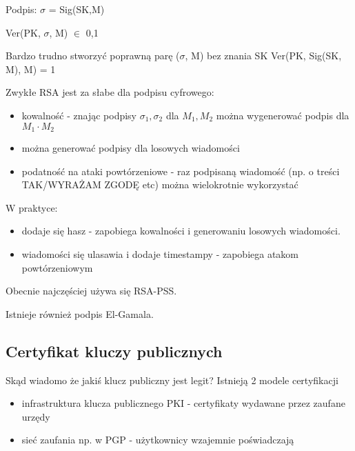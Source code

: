 Podpis: $\sigma$ = Sig(SK,M)

Ver(PK, $\sigma$, M) $\in$ {0,1}


Bardzo trudno stworzyć poprawną parę ($\sigma$, M) bez znania SK
Ver(PK, Sig(SK, M), M) = 1

Zwykłe RSA jest za słabe dla podpisu cyfrowego:
\begin{itemize}
    \item kowalność - znając podpisy $\sigma_1, \sigma_2$ dla $M_1, M_2$ można wygenerować podpis dla $M_1 \cdot M_2$

    \item można generować podpisy dla losowych wiadomości

    \item podatność na ataki powtórzeniowe - raz podpisaną wiadomość (np. o treści TAK/WYRAŻAM ZGODĘ etc) można wielokrotnie wykorzystać
\end{itemize}

W praktyce:
\begin{itemize}
    \item dodaje się hasz - zapobiega kowalności i generowaniu losowych wiadomości. 

    \item wiadomości się ulasawia i dodaje timestampy - zapobiega atakom powtórzeniowym
\end{itemize}

Obecnie najczęściej używa się RSA-PSS.

Istnieje również podpis El-Gamala.

\subsection{Certyfikat kluczy publicznych}
Skąd wiadomo że jakiś klucz publiczny jest legit?
Istnieją 2 modele certyfikacji
\begin{itemize}
    \item infrastruktura klucza publicznego PKI - certyfikaty wydawane przez zaufane urzędy

    \item sieć zaufania np. w PGP - użytkownicy wzajemnie poświadczają
\end{itemize}



